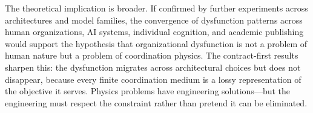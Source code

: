 \documentclass[11pt,a4paper]{article}
\begin{document}
The theoretical implication is broader. If confirmed by further experiments across architectures and model families, the convergence of dysfunction patterns across human organizations, AI systems, individual cognition, and academic publishing \citep{mcentire2025d} would support the hypothesis that organizational dysfunction is not a problem of human nature but a problem of coordination physics. The contract-first results sharpen this: the dysfunction migrates across architectural choices but does not disappear, because every finite coordination medium is a lossy representation of the objective it serves. Physics problems have engineering solutions---but the engineering must respect the constraint rather than pretend it can be eliminated.




\end{document}
